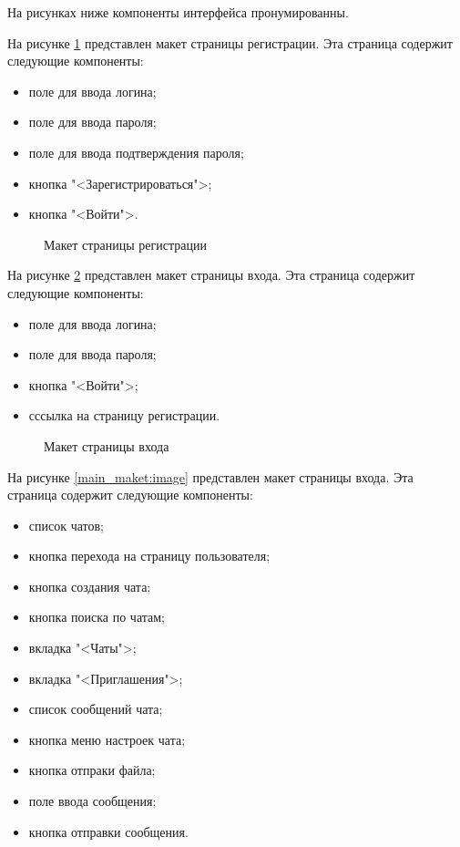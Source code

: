 На рисунках ниже компоненты интерфейса пронумированны.

На рисунке \ref{signup_maket:image} представлен макет страницы регистрации. Эта страница содержит следующие компоненты:
\begin{itemize}
	\item поле для ввода логина;
	\item поле для ввода пароля;
	\item поле для ввода подтверждения пароля;
	\item кнопка "<Зарегистрироваться">;
	\item кнопка "<Войти">.
\end{itemize}

\begin{figure}[H]
	\caption{Макет страницы регистрации}
	\label{signup_maket:image}
\end{figure}

На рисунке \ref{signin_maket:image} представлен макет страницы входа. Эта страница содержит следующие компоненты:
\begin{itemize}
	\item поле для ввода логина;
	\item поле для ввода пароля;
	\item кнопка "<Войти">;
	\item сссылка на страницу регистрации.
\end{itemize}

\begin{figure}[H]
	\caption{Макет страницы входа}
	\label{signin_maket:image}
\end{figure}

На рисунке \ref{main_maket:image} представлен макет страницы входа. Эта страница содержит следующие компоненты:
\begin{itemize}
	\item список чатов;
	\item кнопка перехода на страницу пользователя;
	\item кнопка создания чата;
	\item кнопка поиска по чатам;
	\item вкладка "<Чаты">;
	\item вкладка "<Приглашения">;
	\item список сообщений чата;
	\item кнопка меню настроек чата;
	\item кнопка отпраки файла;
	\item поле ввода сообщения;
	\item кнопка отправки сообщения.
\end{itemize}

